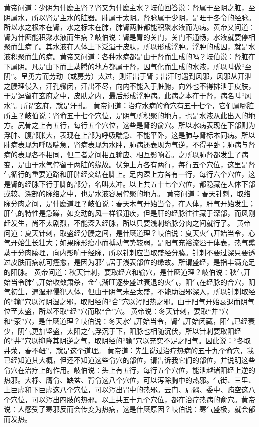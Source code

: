 \documentclass[a4paper,12pt,UTF8,twoside]{ctexbook}
\begin{document}
黄帝问道：少阴为什麽主肾？肾又为什麽主水？岐伯回答说：肾属于至阴之脏，至阴属水，所以肾是主水的脏器。肺属于太阴。肾脉属于少阴，是旺于冬令的经脉。所以水之根本在肾，水之标末在肺，肺肾两脏都能积聚水液而为病。黄帝又问道：肾为什麽能积聚水液而生病？岐伯说：肾是胃的关门，关门不通畅，水液就要停相聚而生病了。其水液在人体上下泛溢于皮肤，所以形成浮肿。浮肿的成因，就是水液积聚而生的病。黄帝又问道：各种水病都是由于肾而生成的吗？岐伯说：肾脏在下属阴。凡是由下而上蒸腾的地方都属于肾，因气化而生成的水液，所以叫做“至阴”。呈勇力而劳动（或房劳）太过，则汗出于肾；出汗时遇到风邪，风邪从开泄之腠理侵入，汗孔骤闭，汗出不尽，向内不能入于脏腑，向外也不得排泄于皮肤，于是逗留在玄府之中，皮肤之内，最后形成浮肿病。此病之本在于肾，病名叫“风水”。所谓玄府，就是汗孔。
黄帝问道：治疗水病的俞穴有五十七个，它们属哪脏所主？岐伯说：肾俞五十七个穴位，是阴气所积聚的地方，也是水液从此出入的地方。尻骨之上有五行，每行五个穴位，这些是肾的俞穴。所以水病表现在下部则为浮肿、腹部胀大，表现在上部为呼吸喘急、不能平卧，这是肺与肾标本同病。所以肺病表现为呼吸喘急，肾病表现为水肿，肺病还表现为气逆，不得平卧；肺病与肾病的表现各不相同，但二者之间相互输应、相互影响着。之所以肺肾都发生了病变，是由于水气停留于两脏的缘故。伏兔上方各有两行，每行五个穴位，这里是肾气循行的重要道路和肝脾经交结在脚上。足内踝上方各有一行，每行六个穴位，这是肾的经脉下行于脚的部分，名叫太冲。以上共五十七个穴位，都隐藏在人体下部或较、深部的脉络之中，也是水液容易停聚的地方。
黄帝问道：春天针刺，取络脉分肉之间，是什麽道理？岐伯说：春天木气开始当令，在人体，肝气开始发生；肝气的特性是急躁，如变动的风一样很迅疾，但是肝的经脉往往藏于深部，而风刚赶发生，尚不太剧烈，不能深入经脉，所以只要浅刺络脉分肉之间就行了。
黄帝问道：夏天针刺，取盛经分腠之间，是什麽道理？岐伯说：夏天火气开始当令，心气开始生长壮大；如果脉形瘦小而搏动气势较弱，是阳气充裕流溢于体表，热气熏蒸于分肉腠理，向内影响于经脉，所以针刺应当取盛经分腠。针刺不要过深只要透过皮肤而病就可痊愈，是因为邪气居于浅表部位的缘故。所谓盛经，是指丰满充足的阳脉。
黄帝问道：秋天针刺，要取经穴和输穴，是什麽道理？岐伯说：秋气开始当令肺气开始收敛肃杀，金气渐旺逐步盛过衰退的火气，阳气在经脉的合穴，阴气初生，遇湿邪侵犯人体，但由于阴气未至太盛，不能助湿邪深入，所以针刺取经的“输”穴以泻阴湿之邪，取阳经的“合”穴以泻阳热之邪。由于阳气开始衰退而阴气位至太盛，所以不取“经”穴而取“合”穴。
黄帝说：冬天针刺，要取“井”穴和“荥”穴，是什麽道理？岐伯说：冬天水气开始当令，肾气开始闭藏，阳气已经衰少，阴气更加坚盛，太阳之气浮沉于下，阳脉也相随沉伏，所以针刺要取阳经的“井”穴以抑降其阴逆之气，取阴经的“输”穴以充实不足之阳气。因此说：“冬取井荥，春不衄”，就是这个道理。
黄帝道：先生说过治疗热病的五十九个俞穴，我已经知道其大概，但还不知道这些俞穴的部位，请告诉我它们的部位，并说明这些俞穴在治疗上的作用。岐伯说：头上有五行，每行五个穴位，能泄越诸阳经上逆的热邪。大杼、膺俞、缺盆、背俞这八个穴位，可以泻除胸中的热邪。气街、三里、上巨虚和下巨虚这八个穴位，可以泻出胃中的热邪。云门、肩髃、委中、贿空这八个穴位，可以泻出四肢的热邪。以上共五十九个穴位，都在治疗热病的俞穴。黄帝说：人感受了寒邪反而会传变为热病，这是什麽原因？岐伯说：寒气盛极，就会郁而发热。
\end{document}
